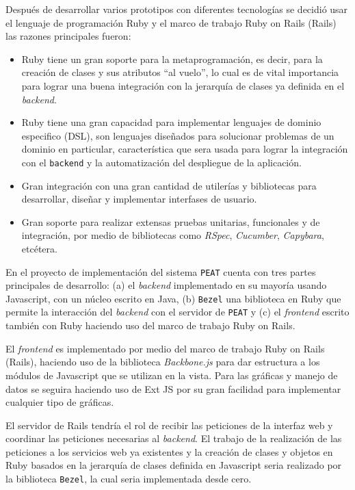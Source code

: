 Después de desarrollar varios prototipos con diferentes tecnologías se decidió
usar el lenguaje de programación Ruby y el marco de trabajo Ruby on Rails (Rails)
las razones principales fueron:

\begin{itemize}
\item Ruby tiene un gran soporte para la metaprogramación, es decir, para la
  creación de clases y sus atributos ``al vuelo'', lo cual es de vital
  importancia para lograr una buena integración con la jerarquía de clases
  ya definida en el \textit{backend}.
\item Ruby tiene una gran capacidad para implementar lenguajes de dominio
  especifico (DSL), son lenguajes diseñados para solucionar problemas de un dominio
  en particular, característica que sera usada para lograr la integración con el
  \texttt{backend} y la automatización del despliegue de la aplicación.
\item Gran integración con una gran cantidad de utilerías y bibliotecas para
  desarrollar, diseñar y implementar interfases de usuario.
\item Gran soporte para realizar extensas pruebas unitarias, funcionales
  y de integración, por medio de bibliotecas como \textit{RSpec}, \textit{Cucumber},
  \textit{Capybara}, etcétera.
\end{itemize}

En el proyecto de implementación del sistema \texttt{PEAT}
cuenta con tres partes principales de desarrollo:
(a) el \textit{backend}  implementado en su mayoría usando
Javascript, con un núcleo escrito en Java, (b) \texttt{Bezel}
una biblioteca en Ruby que permite la interacción del \textit{backend}
con el servidor de \texttt{PEAT} y (c) el \textit{frontend} escrito
también con Ruby haciendo uso del marco de trabajo Ruby on Rails.

El \textit{frontend} es implementado por medio del marco de trabajo
Ruby on Rails (Rails), haciendo uso de la biblioteca \textit{Backbone.js}
para dar estructura a los módulos de Javascript que se utilizan en la vista.
Para las gráficas y manejo de datos se seguira haciendo uso de Ext JS
por su gran facilidad para implementar cualquier tipo de gráficas.

El servidor de Rails tendría el rol de recibir las peticiones de la
interfaz web y coordinar las peticiones necesarias al \textit{backend}. El trabajo
de la realización de las peticiones a los servicios web ya existentes
y la creación de clases y objetos en Ruby basados en la jerarquía de clases
definida en Javascript seria realizado por la biblioteca \texttt{Bezel},
la cual seria implementada desde cero.

